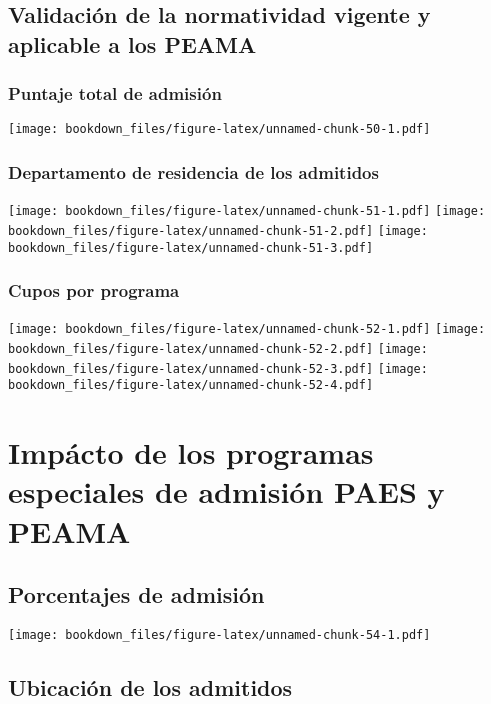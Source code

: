 \documentclass[]{article}
\theoremstyle{definition}
\theoremstyle{definition}
\theoremstyle{definition}
\theoremstyle{remark}
\begin{document}
\subsection{Validación de la normatividad vigente y aplicable a los
PEAMA}\label{validacion-de-la-normatividad-vigente-y-aplicable-a-los-peama}

\subsubsection{Puntaje total de
admisión}\label{puntaje-total-de-admision-1}

\texttt{[image: bookdown\_files/figure-latex/unnamed-chunk-50-1.pdf]}

\subsubsection{Departamento de residencia de los
admitidos}\label{departamento-de-residencia-de-los-admitidos}

\texttt{[image: bookdown\_files/figure-latex/unnamed-chunk-51-1.pdf]}
\texttt{[image: bookdown\_files/figure-latex/unnamed-chunk-51-2.pdf]}
\texttt{[image: bookdown\_files/figure-latex/unnamed-chunk-51-3.pdf]}

\subsubsection{Cupos por programa}\label{cupos-por-programa}

\texttt{[image: bookdown\_files/figure-latex/unnamed-chunk-52-1.pdf]}
\texttt{[image: bookdown\_files/figure-latex/unnamed-chunk-52-2.pdf]}
\texttt{[image: bookdown\_files/figure-latex/unnamed-chunk-52-3.pdf]}
\texttt{[image: bookdown\_files/figure-latex/unnamed-chunk-52-4.pdf]}

\section{Impácto de los programas especiales de admisión PAES y
PEAMA}\label{impacto-de-los-programas-especiales-de-admision-paes-y-peama}

\subsection{Porcentajes de admisión}\label{porcentajes-de-admision}

\texttt{[image: bookdown\_files/figure-latex/unnamed-chunk-54-1.pdf]}

\subsection{Ubicación de los
admitidos}\label{ubicacion-de-los-admitidos}
\end{document}
